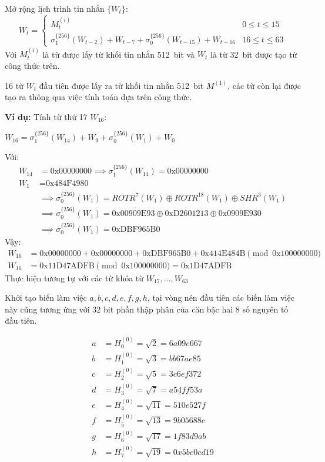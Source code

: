 \begin{enumerate}[label=\textbf{Bước \arabic*:}, leftmargin = 2.5cm]
	\item Mở rộng lịch trình tin nhắn $\{W_t\}$:
	\[
	W_t = \begin{cases} 
		M_t^{(i)} & 0 \leq t \leq 15 \\
		\sigma_1^{\{256\}}(W_{t-2}) + W_{t-7} + \sigma_0^{\{256\}}(W_{t-15}) + W_{t-16} & 16 \leq t \leq 63 
	\end{cases}
	\]
	Với $M_t^{(i)}$ là từ được lấy từ khối tin nhắn 512~bit và $W_t$ là từ 32~bit được tạo từ công thức trên.

16 từ $W_t$ đầu tiên được lấy ra từ khối tin nhắn 512~bit $M^(1)$, các từ còn lại được tạo ra thông qua việc tính toán dựa trên công thức.

\textbf{Ví dụ:} Tính từ thứ 17 $W_{16}$:
\begin{center}
	$W_{16} = \sigma_1^{\{256\}}(W_{14}) + W_{9} + \sigma_0^{\{256\}}(W_{1}) + W_{0}$
\end{center}
{Với:
\begin{align*}
	W_{14} &= \text{0x00000000} \implies \sigma_1^{\{256\}}(W_{14}) = \text{0x00000000} \\
	W_{1} &= \text{0x484F4980} \\
	&\implies \sigma_0^{\{256\}}(W_{1}) = ROTR^{7}(W_1) \oplus ROTR^{18}(W_1) \oplus SHR^{3}(W_1) \\
	&\implies \sigma_0^{\{256\}}(W_{1}) = \text{0x00909E93} \oplus \text{0xD2601213} \oplus \text{0x0909E930}\\
	&\implies \sigma_0^{\{256\}}(W_{1}) = \text{0xDBF965B0}
\end{align*}
Vậy: 
{	\small
	\begin{align*}
	W_{16} &= \text{0x00000000} + \text{0x00000000} + \text{0xDBF965B0} + \text{0x414E484B}\pmod {\text{0x100000000}}\\ 
	 W_{16} &= \text{0x11D47ADFB} {\pmod {\text{0x100000000}}} = \text{0x1D47ADFB}   
\end{align*}}
Thực hiện tương tự với các từ khóa từ $W_{17},...,W_{63}$

\item Khởi tạo biến làm việc $a,b,c,d,e,f,g,h$, tại vòng nén đầu tiên các biến làm việc này cũng tương ứng với 32 bit phần thập phân của căn bậc hai 8 số nguyên tố đầu tiên.

\begin{align*}
	a &= H_0^{(0)} = \sqrt{2} = 6a09e667 \\
	b &= H_1^{(0)} = \sqrt{3} = bb67ae85 \\
	c &= H_2^{(0)} = \sqrt{5} = 3c6ef372 \\
	d &= H_3^{(0)} = \sqrt{7} = a54ff53a \\
	e &= H_4^{(0)} = \sqrt{11} = 510e527f \\
	f &= H_5^{(0)} = \sqrt{13} = 9b05688c \\
	g &= H_6^{(0)} = \sqrt{17} = 1f83d9ab \\
	h &= H_7^{(0)} = \sqrt{19} = 0x5be0cd19 \\	
\end{align*}

}
\end{enumerate}
